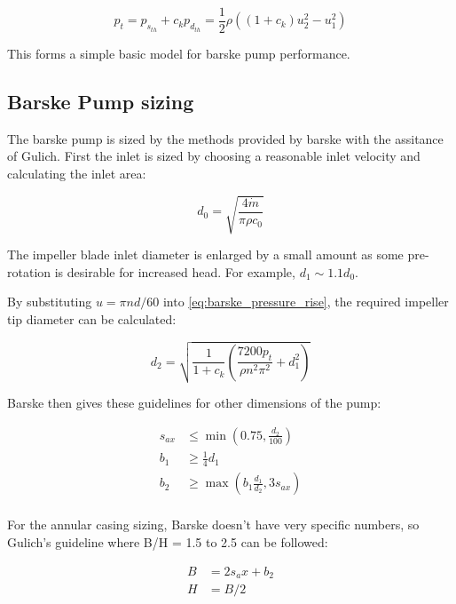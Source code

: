 \begin{equation}
    p_t = p_{s_{th}} + c_k p_{d_{th}}=\frac{1}{2}\rho\left((1+c_k) u_2^2 - u_1^2\right)
    \label{eq:barske_pressure_rise}
\end{equation}

This forms a simple basic model for barske pump performance. 

\subsection{Barske Pump sizing}

The barske pump is sized by the methods provided by barske \cite{barske 1953} with the assitance of Gulich. First the inlet is sized by choosing a reasonable inlet velocity and calculating the inlet area:

\begin{equation}
    d_0 = \sqrt{\frac{4\dot{m}}{\pi \rho c_0}}
    \label{eq:barske_inlet_diameter}
\end{equation}

The impeller blade inlet diameter is enlarged by a small amount as some pre-rotation is desirable for increased head. For example, $d_1\sim1.1d_0$.

By substituting $u=\pi n d / 60$ into \cref{eq:barske_pressure_rise}, the required impeller tip diameter can be calculated:

\begin{equation}
    d_2 = \sqrt{\frac{1}{1+c_k}\left(\frac{7200p_t}{\rho n^2\pi^2} + d_1^2\right)}
    \label{eq:barske_tip_diameter}
\end{equation}

Barske then gives these guidelines for other dimensions of the pump:

\begin{align}
    s_{ax} & \leq \min{\left(0.75, \frac{d_2}{100}\right)} \\
    b_1 & \geq \frac{1}{4} d_1 \\ %
    b_2 & \geq \max{\left(b_1 \frac{d_1}{d_2}, 3s_{ax}\right)} \\
\end{align}

For the annular casing sizing, Barske doesn't have very specific numbers, so Gulich's guideline where B/H = 1.5 to 2.5 can be followed:

\begin{align}
    B & = 2 s_ax + b_2 \\
    H & = B / 2
\end{align}

